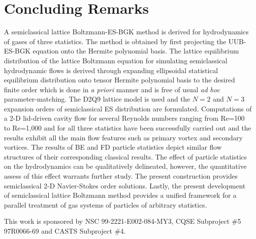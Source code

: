 \documentclass[doublecol]{epl2}
\begin{document}
\section{Concluding Remarks}
A semiclassical lattice Boltzmann-ES-BGK method is derived for hydrodynamics of gases of three statistics. The method is obtained by first projecting the UUB-ES-BGK equation onto the Hermite polynomial basis.  The lattice equilibrium distribution of the lattice Boltzmann equation for simulating semiclassical hydrodynamic flows is derived through expanding ellipsoidal statistical equilibrium distribution onto tensor Hermite polynomial basis to the desired finite order which is done in {\sl a priori} manner and is free of usual {\sl ad hoc} parameter-matching. The D2Q9 lattice model is used and the $N=2$ and $N=3$ expansion orders of semiclassical ES distribution are formulated. Computations of a 2-D lid-driven cavity flow for several Reynolds numbers ranging from Re=100 to Re=1,000 and for all three statistics have been successfully carried out and the results exhibit all the main flow features such as primary vortex and secondary vortices. The results of BE and FD particle statistics depict similar flow structures of their corresponding classical results. The effect of particle statistics on the hydrodynamics can be qualitatively delineated, however, the quantitative assess of this effect warrants further study.  The present construction provides semiclassical 2-D Navier-Stokes order solutions. Lastly, the present development of semiclassical lattice Boltzmann method provides a unified framework for a parallel treatment of gas systems of particles of arbitrary statistics.

\acknowledgments
This work is sponsored by NSC 99-2221-E002-084-MY3, CQSE Subproject \#5 97R0066-69 and CASTS Subproject \#4.
\end{document}
